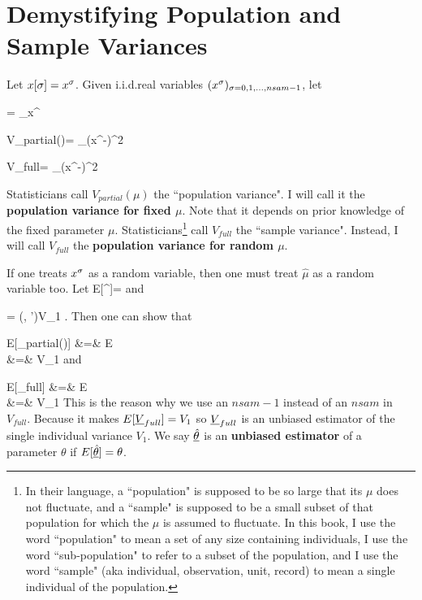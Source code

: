 \section{Demystifying Population 
and Sample Variances}
Let $x[\sigma]=x^\sigma$.
Given  i.i.d.real  variables
$(x^\sigma)_{\sigma=0,1, \ldots, nsam-1}$,
let

\beq
\hat{\mu}
=
\sum_\s x^\s
\eeq

\beq
V_{partial}(\mu)=
\sum_\s (x^\s-\mu)^2
\eeq

\beq
V_{full}=
\sum_\s (x^\s-\hat{\mu})^2
\eeq

Statisticians call
$V_{partial}(\mu)$ the 
``population variance". I will 
call it the {\bf population 
variance for fixed $\mu$}. 
Note that it depends 
on prior knowledge of
the fixed parameter $\mu$.
Statisticians\footnote{  
In their language,
 a ``population"
is supposed to be
so large that its $\mu$
does not fluctuate,
and a ``sample" is
supposed to be a small
subset of that population
for which the $\mu$
is assumed to fluctuate.
In this book, I
use the word ``population"
to mean a set of any size
containing individuals, I use
the word ``sub-population"
to refer to a subset
of the population,
and I use the 
word ``sample"
(aka individual, observation, unit,
record)  to mean a
single individual
of the population.}   call
$V_{full}$ the 
``sample variance".
Instead, 
 I will 
call $V_{full}$ the {\bf 
population 
variance for random $\mu$}. 

If one treats $x^\sigma$ as a random
variable, then one must treat
$\hat{\mu}$
as a random variable too.
Let
\beq
E[\rvx^\s]=\mu
\eeq
and

\beq
{}=
\delta(\s, \s')V_1
\;.
\eeq
Then one can show that

\beqa
E[\rvV_{partial}(\mu)]
&=&
E\left[
\sum_\s (\rvx^\s-\mu)^2
\right]
\\
&=&
V_1
\eeqa
and

\beqa
E[\rvV_{full}]
&=&
E\left[
\sum_\s (\rvx^\s-\hat{\ul{\mu}})^2
\right]
\\
&=&
V_1
\eeqa
This is the 
reason
why 
we use
an $nsam-1$
instead 
of an $nsam$
in $V_{full}$.
Because it
makes
$E[{\underline{V}}_{full}]=V_1$
so 
${\underline{V}}_{full}$
is an
unbiased estimator of 
the single individual variance $V_1$.
We say $\underline{\hat{\theta}}$ is an {\bf unbiased estimator} 
of a parameter $\theta$
if $E[\underline{\hat{\theta}}]=\theta$.


